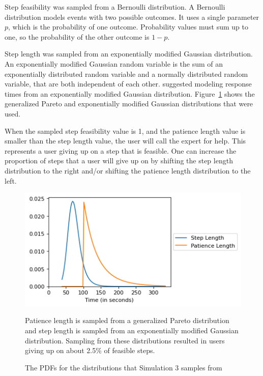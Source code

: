 Step feasibility was sampled from a Bernoulli distribution.
A Bernoulli distribution models events with two possible outcomes.
It uses a single parameter $p$, which is the probability of one outcome.
Probability values must sum up to one, so the probability of the other outcome
is $1-p$.

Step length was sampled from an exponentially modified Gaussian distribution.
An exponentially modified Gaussian random variable is the sum of an
exponentially distributed random variable and a normally distributed random
variable, that are both independent of each other.
\citet{dawson1988fitting} suggested modeling response times from an
exponentially modified Gaussian distribution.
Figure~\ref{fig:sim3_dists} shows the generalized Pareto and exponentially
modified Gaussian distributions that were used.

When the sampled step feasibility value is 1, and the patience length value is
smaller than the step length value, the user will call the expert for help.
This represents a user giving up on a step that is feasible.
One can increase the proportion of steps that a user will give up on by shifting
the step length distribution to the right and/or shifting the patience length
distribution to the left.

\begin{figure}[H]
  \includegraphics{figures/montecarlo/step_patience.png}
  \begin{captiontext}
    Patience length is sampled from a generalized Pareto distribution and step
    length is sampled from an exponentially modified Gaussian distribution.
    Sampling from these distributions resulted in users giving up on about 2.5\%
    of feasible steps.
  \end{captiontext}
  \caption{
    The PDFs for the distributions that Simulation 3 samples from
  }\label{fig:sim3_dists}
\end{figure}

